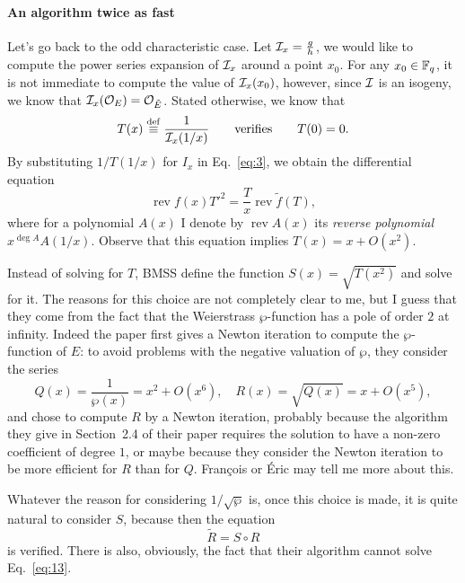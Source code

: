 \documentclass{article}
\DeclareMathOperator{\rev}{rev}
\begin{document}
\paragraph{An algorithm twice as fast}
Let's go back to the odd characteristic case.  Let $\mathcal{I}_x =
\frac{g}{h}$, we would like to compute the power series expansion of
$\mathcal{I}_x$ around a point $x_0$. For any $x_0\in\mathbb{F}_q$, it is not immediate
to compute the value of $\mathcal{I}_x(x_0)$, however, since $\mathcal{I}$ is an
isogeny, we know that $\mathcal{I}_x(\mathcal{O}_E) = \mathcal{O}_{\tilde{E}}$. Stated otherwise,
we know that
\begin{equation}
  \label{eq:12}
  T(x) \overset{\mathrm{def}}{\equiv} \frac{1}{\mathcal{I}_x(1/x)} \qquad\text{verifies}\qquad T(0) = 0.
\end{equation}
By substituting $1/T(1/x)$ for $I_x$ in Eq.~\eqref{eq:3}, we obtain
the differential equation
\begin{equation}
  \label{eq:13}
  \rev f(x) {T'}^2 = \frac{T}{x}\rev\tilde f(T),
\end{equation}
where for a polynomial $A(x)$ I denote by $\rev A(x)$ its
\emph{reverse polynomial} $x^{\deg A}A(1/x)$. Observe that this
equation implies $T(x) = x + O(x^2)$.

Instead of solving for $T$, BMSS define the function $S(x) =
\sqrt{T(x^2)}$ and solve for it. The reasons for this choice are not
completely clear to me, but I guess that they come from the fact that
the Weierstrass $\wp$-function has a pole of order $2$ at
infinity. Indeed the paper first gives a Newton iteration to compute
the $\wp$-function of $E$: to avoid problems with the negative
valuation of $\wp$, they consider the series
\begin{equation}
  \label{eq:10}
  Q(x) = \frac{1}{\wp(x)} = x^2 + O(x^6), \quad R(x) = \sqrt{Q(x)} = x + O(x^5),
\end{equation}
and chose to compute $R$ by a Newton iteration, probably because the
algorithm they give in Section~2.4 of their paper requires the
solution to have a non-zero coefficient of degree $1$, or maybe
because they consider the Newton iteration to be more efficient for
$R$ than for $Q$. François or Éric may tell me more about this.

Whatever the reason for considering $1/\sqrt{\wp}$ is, once this
choice is made, it is quite natural to consider $S$, because then the
equation
\begin{equation}
  \label{eq:11}
  \tilde{R} = S\circ R
\end{equation}
is verified. There is also, obviously, the fact that their algorithm
cannot solve Eq.~\eqref{eq:13}.
\end{document}
